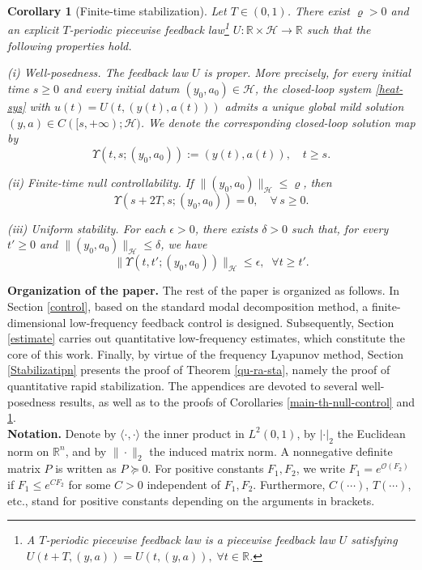 \documentclass[a4paper]{article}
\newtheorem{corollary}[theorem]{Corollary}
\numberwithin{equation}{section}
\begin{document}
\begin{corollary}[Finite-time stabilization] \label{f-t-s}
Let $T\in(0,1)$. There exist $\varrho>0$ and an explicit $T$-periodic piecewise feedback law\footnote{A $T$-periodic piecewise feedback law is a piecewise feedback law $U$ satisfying $U(t+T,(y,a))=U(t,(y,a)),\;\forall t\in\mathbb{R}$.} $U:\mathbb{R}\times\mathcal{H}\to\mathbb{R}$ such that the following properties hold.

\smallskip

\noindent\textup{(i) Well-posedness.}
The feedback law $U$ is proper. More precisely, for every initial time $s\ge 0$ and every initial datum $(y_0,a_0)\in\mathcal{H}$, the closed-loop system \eqref{heat-sys} with $u(t)=U(t,(y(t),a(t)))$ admits a unique global mild solution
$(y,a)\in C([s,+\infty);\mathcal{H})$. We denote the corresponding closed-loop solution map by
\[
\Upsilon(t,s;(y_0,a_0)) := (y(t),a(t)),\quad t\ge s.
\]

\smallskip

\noindent\textup{(ii) Finite-time null controllability.}
If $\|(y_0,a_0)\|_{\mathcal{H}}\le \varrho$, then
\[
\Upsilon(s+2T,s;(y_0,a_0))=0,\quad \forall\, s\ge 0.
\]

\smallskip

\noindent\textup{(iii) Uniform stability.}
For each $\epsilon>0$, there exists $\delta >0$ such that, for every $t'\ge 0$ and $\|(y_0,a_0)\|_{\mathcal{H}}\le \delta$, we have $$\| \Upsilon(t,t';(y_0,a_0))\|_{\mathcal{H}}\le\epsilon, \;\;\forall t\ge t'.$$
\end{corollary}


\noindent \textbf{Organization of the paper.} The rest of the paper is organized as follows. In Section \ref{control}, based on the standard modal decomposition method, a finite-dimensional low-frequency feedback control is designed. Subsequently, Section \ref{estimate} carries out quantitative low-frequency estimates, which constitute the core of this work. Finally, by virtue of the frequency Lyapunov method, Section \ref{Stabilizatipn} presents the proof of Theorem \ref{qu-ra-sta}, namely the proof of quantitative rapid stabilization. The appendices are devoted to several well-posedness results, as well as to the proofs of Corollaries \ref{main-th-null-control} and \ref{f-t-s}.\\[-2mm]

\noindent \textbf{Notation.} Denote by $\langle\cdot,\cdot\rangle$ the inner product in $L^2(0,1)$, by $|\cdot|_2$ the Euclidean norm on $\mathbb{R}^n$, and by $\|\cdot\|_2$ the induced matrix norm. A nonnegative definite matrix $P$ is written as $P\succeq 0$. For positive constants $F_1,F_2$, we write $F_1=e^{\mathcal{O}(F_2)}$ if $F_1\le e^{CF_2}$ for some $C>0$ independent of $F_1,F_2$. Furthermore, $C(\cdots)$, $T(\cdots)$, etc., stand for positive constants depending on the arguments in brackets.\\[-2mm]
\end{document}
